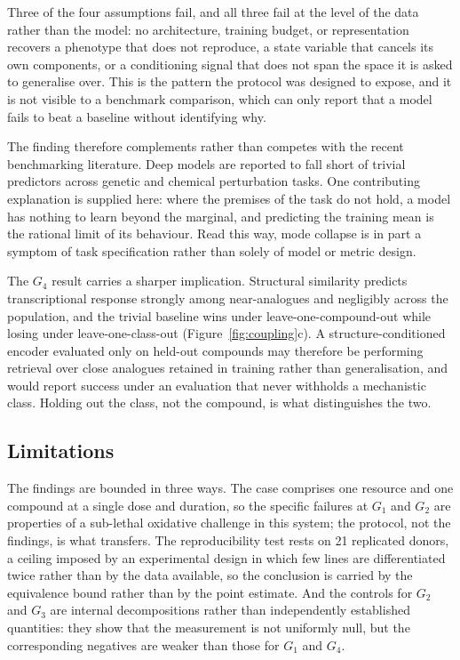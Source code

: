 \documentclass[5p,times,twocolumn]{elsarticle}
\begin{document}
Three of the four assumptions fail, and all three fail at the level of the data
rather than the model: no architecture, training budget, or representation
recovers a phenotype that does not reproduce, a state variable that cancels its
own components, or a conditioning signal that does not span the space it is
asked to generalise over. This is the pattern the protocol was designed to
expose, and it is not visible to a benchmark comparison, which can only report
that a model fails to beat a baseline without identifying why.
 
The finding therefore complements rather than competes with the recent
benchmarking literature. Deep models are reported to fall short of trivial
predictors across genetic \cite{ahlmann2025deep} and chemical
\cite{wu2026perturbench, radig2026scarchon} perturbation tasks. One contributing
explanation is supplied here: where the premises of the task do not hold, a
model has nothing to learn beyond the marginal, and predicting the training
mean is the rational limit of its behaviour. Read this way, mode collapse
\cite{mejia2025diversity} is in part a symptom of task specification rather
than solely of model or metric design.
 
The $G_4$ result carries a sharper implication. Structural similarity predicts
transcriptional response strongly among near-analogues and negligibly across
the population, and the trivial baseline wins under leave-one-compound-out
while losing under leave-one-class-out (Figure~\ref{fig:coupling}c). A
structure-conditioned encoder evaluated only on held-out compounds may
therefore be performing retrieval over close analogues retained in training
rather than generalisation, and would report success under an evaluation that
never withholds a mechanistic class. Holding out the class, not the compound,
is what distinguishes the two.

\subsection{\textbf{Limitations}}

The findings are bounded in three ways. The case comprises one resource and one
compound at a single dose and duration, so the specific failures at $G_1$ and
$G_2$ are properties of a sub-lethal oxidative challenge in this system; the
protocol, not the findings, is what transfers. The reproducibility test rests on
21 replicated donors, a ceiling imposed by an experimental design in which few
lines are differentiated twice rather than by the data available, so the
conclusion is carried by the equivalence bound rather than by the point
estimate. And the controls for $G_2$ and $G_3$ are internal decompositions
rather than independently established quantities: they show that the measurement
is not uniformly null, but the corresponding negatives are weaker than those for
$G_1$ and $G_4$.
\end{document}
